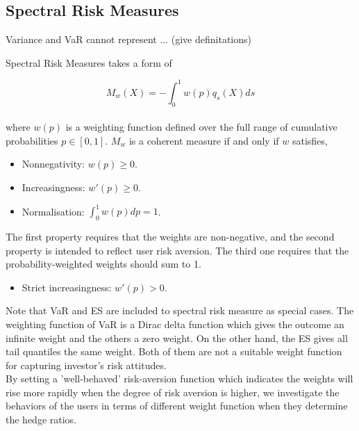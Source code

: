 \subsection{Spectral Risk Measures}\label{subsec:spectral-risk-measures}
Variance and VaR cannot represent ... (give definitations)


Spectral Risk Measures takes a form of

\begin{equation}\label{eq:SRM}
	M_{w}(X)=- \int^1_{0} w(p)q_{s}(X)ds
	\end{equation}\\

\noindent where $w(p)$ is a weighting function defined over the full range of cumulative probabilities $p \in [0,1]$. $M_{w}$ is a coherent measure if and only if $w$ satisfies, \\

\begin{itemize}
			\item Nonnegativity: $w(p) \ge 0$.
			\item Increasingness: $w'(p) \ge 0$.
			\item Normalisation: $\int^1_{0}w(p)dp=1$.
\end{itemize}
The first property requires that the weights are non-negative, and the second property is intended to reflect user risk aversion. The third one requires that the probability-weighted weights should sum to 1. %
\begin{itemize}
			\item Strict increasingness: $w'(p) > 0$.
\end{itemize}

\noindent Note that VaR and ES are included to spectral risk measure as special cases. The weighting function of VaR is a Dirac delta function which gives the outcome an infinite weight and the others a zero weight. On the other hand, the ES gives all tail quantiles the same weight. Both of them are not a suitable weight function for capturing investor's risk attitudes. \\

By setting a 'well-behaved' risk-aversion function which indicates the weights will rise more rapidly when the degree of risk aversion is higher, we investigate the behaviors of the users in terms of different weight function when they determine the hedge ratios. \\

